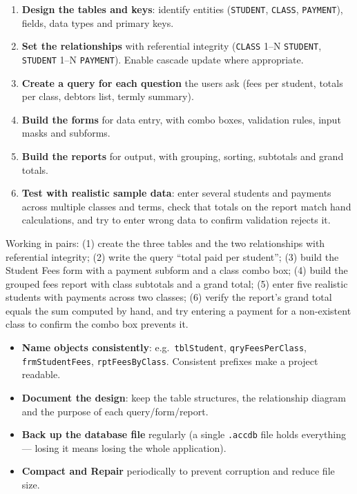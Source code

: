 \documentclass[11pt]{article}
\newcounter{popsec}
\newcounter{popsub}
\newcommand{\courssub}[1]{%
  \stepcounter{popsub}%
  \par\vspace{9pt}\noindent{\popxbold\fontsize{11.5}{13}\selectfont\color{popink}{\color{poporange}\thepopsec.\thepopsub}\hspace{6pt}#1}\par\nopagebreak\vspace{4pt}
}
\begin{document}
\begin{methode}
\begin{enumerate}
\item \textbf{Design the tables and keys}: identify entities (\texttt{STUDENT}, \texttt{CLASS}, \texttt{PAYMENT}), fields, data types and primary keys.
\item \textbf{Set the relationships} with referential integrity (\texttt{CLASS} 1--N \texttt{STUDENT}, \texttt{STUDENT} 1--N \texttt{PAYMENT}). Enable cascade update where appropriate.
\item \textbf{Create a query for each question} the users ask (fees per student, totals per class, debtors list, termly summary).
\item \textbf{Build the forms} for data entry, with combo boxes, validation rules, input masks and subforms.
\item \textbf{Build the reports} for output, with grouping, sorting, subtotals and grand totals.
\item \textbf{Test with realistic sample data}: enter several students and payments across multiple classes and terms, check that totals on the report match hand calculations, and try to enter wrong data to confirm validation rejects it.
\end{enumerate}
\end{methode}

\begin{experience}
Working in pairs: (1) create the three tables and the two relationships with referential integrity; (2) write the query ``total paid per student''; (3) build the Student Fees form with a payment subform and a class combo box; (4) build the grouped fees report with class subtotals and a grand total; (5) enter five realistic students with payments across two classes; (6) verify the report's grand total equals the sum computed by hand, and try entering a payment for a non-existent class to confirm the combo box prevents it.
\end{experience}

\courssub{Good Practice and Exam Readiness}

\begin{aretenir}
\begin{itemize}
\item \textbf{Name objects consistently}: e.g.\ \texttt{tblStudent}, \texttt{qryFeesPerClass}, \texttt{frmStudentFees}, \texttt{rptFeesByClass}. Consistent prefixes make a project readable.
\item \textbf{Document the design}: keep the table structures, the relationship diagram and the purpose of each query/form/report.
\item \textbf{Back up the database file} regularly (a single \texttt{.accdb} file holds everything --- losing it means losing the whole application).
\item \textbf{Compact and Repair} periodically to prevent corruption and reduce file size.
\end{itemize}
\end{aretenir}
\end{document}
